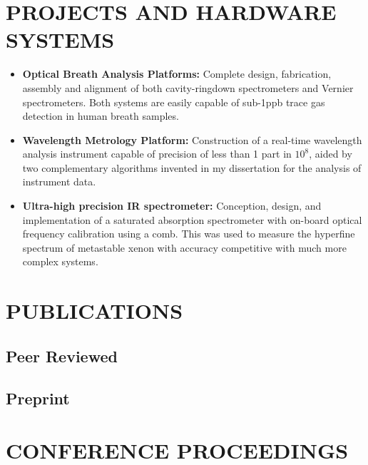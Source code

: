 \documentclass[a4paper,9pt]{extarticle}
\begin{document}
	\section*{PROJECTS AND HARDWARE SYSTEMS}
	\begin{itemize}
		\item \textbf{Optical Breath Analysis Platforms:} Complete design, fabrication, assembly and alignment of both cavity-ringdown spectrometers and Vernier spectrometers. Both systems are easily capable of sub-1ppb trace gas detection in human breath samples.
		
		\item \textbf{Wavelength Metrology Platform:} Construction of a real-time wavelength analysis instrument capable of precision of less than 1 part in $10^8$, aided by two complementary algorithms invented in my dissertation for the analysis of instrument data.
		
		\item \textbf{Ultra-high precision IR spectrometer:} Conception, design, and implementation of a saturated absorption spectrometer with on-board optical frequency calibration using a comb. This was used to measure the hyperfine spectrum of metastable xenon with accuracy competitive with much more complex systems.
		
	\end{itemize}
	
	\section*{PUBLICATIONS}
	
	\nocite{*}
	
	
	\subsection*{Peer Reviewed}
	
	\printbibliography[heading=none,keyword=journal]
	
	\subsection*{Preprint}
	\printbibliography[heading=none,keyword=preprint]
	
	\section*{CONFERENCE PROCEEDINGS}
	
\end{document}
